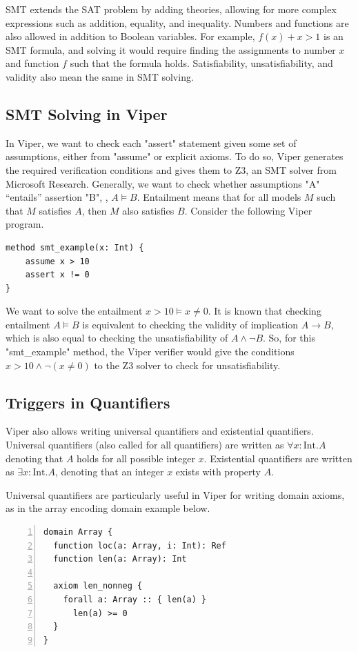 \documentclass[msc,oneside]{ubcthesis}
\theoremstyle{definition}
\begin{document}
SMT extends the SAT problem by adding theories, allowing for more complex expressions such as addition, equality, and inequality. Numbers and functions are also allowed in addition to Boolean variables. For example, $f(x) + x > 1$ is an SMT formula, and solving it would require finding the assignments to number $x$ and function $f$ such that the formula holds. Satisfiability, unsatisfiability, and validity also mean the same in SMT solving.

\subsection{SMT Solving in Viper}
In Viper, we want to check each "assert" statement given some set of assumptions, either from "assume" or explicit axioms. To do so, Viper generates the required verification conditions and gives them to Z3, an SMT solver from Microsoft Research. Generally, we want to check whether assumptions "A" ``entails'' assertion "B", \ie, $A \models B$. Entailment means that for all models $M$ such that $M$ satisfies $A$, then $M$ also satisfies $B$. Consider the following Viper program.
\begin{lstlisting}
method smt_example(x: Int) {
    assume x > 10
    assert x != 0
}
\end{lstlisting}
We want to solve the entailment $x > 10 \models x \neq 0$. It is known that checking entailment $A \models B$ is equivalent to checking the validity of implication $A \rightarrow B$, which is also equal to checking the unsatisfiability of  $A \land \neg B$. So, for this "smt_example" method, the Viper verifier would give the conditions $x > 10\land \neg( x \neq 0)$ to the Z3 solver to check for unsatisfiability. 

\subsection{Triggers in Quantifiers}
Viper also allows writing universal quantifiers and existential quantifiers. Universal quantifiers (also called for all quantifiers) are written as $\forall x: \text{Int}. A$ denoting that $A$ holds for all possible integer $x$. Existential quantifiers are written as $\exists x: \text{Int}. A$, denoting that an integer $x$ exists with property $A$.

Universal quantifiers are particularly useful in Viper for writing domain axioms, as in the array encoding domain example below.
\begin{lstlisting}[language=silver,numbers=left, firstnumber=1, stepnumber=1]
domain Array {
  function loc(a: Array, i: Int): Ref
  function len(a: Array): Int

  axiom len_nonneg {
    forall a: Array :: { len(a) }
      len(a) >= 0
  }
}
\end{lstlisting}
\end{document}
